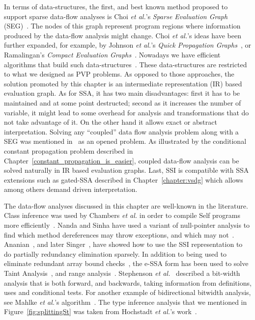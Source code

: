 In terms of data-structures, the first, and best known method proposed to support sparse data-flow analyses is Choi {\em et al.}'s {\em Sparse Evaluation Graph} (SEG)~\cite{Choi91}.
The nodes of this graph represent program regions where information produced by the data-flow analysis might change.
Choi {\em et al.}'s ideas have been further expanded, for example, by Johnson {\em et al.}'s {\em Quick Propagation Graphs}~\cite{Johnson93}, or Ramalingan's {\em Compact Evaluation Graphs}~\cite{Ramalingan02}.
Nowadays we have efficient algorithms that build such data-structures~\cite{Pingali95,Pingali97,Johnson94}.
These data-structures are restricted to what we designed as PVP problems.
As opposed to those approaches, the solution promoted by this chapter is an intermediate representation (IR) based evaluation graph. As for SSA, it has two main disadvantages: first it has to be maintained and at some point destructed; second as it increases the number of variable, it might lead to some overhead for analysis and transformations that do not take advantage of it. On the other hand it allows exact or abstract interpretation. Solving any ``coupled'' data flow analysis problem along with a SEG was mentioned in~\cite{Choi91} as an opened problem. As illustrated by the conditional constant propagation problem described in Chapter~\ref{constant_propagation_is_easier}, coupled data-flow analysis can be solved naturally in IR based evaluation graphs. Last, SSI is compatible with SSA extensions such as gated-SSA described in Chapter~\ref{chapter:vsdg} which allows among others demand driven interpretation.

The data-flow analyses discussed in this chapter are well-known in the literature.
Class inference was used by Chambers {\em et al.} in order to compile Self programs more efficiently~\cite{Chambers89}.
Nanda and Sinha have used a variant of null-pointer analysis to find which method dereferences may throw exceptions, and which may not~\cite{Nanda09}.
Ananian~\cite{Ananian99}, and later Singer~\cite{Singer06}, have showed how to use the SSI representation to do partially redundancy elimination sparsely.
In addition to being used to eliminate redundant array bound checks~\cite{Bodik00}, the e-SSA form has been used to solve Taint Analysis~\cite{Rimsa11}, and range analysis~\cite{Su05,Gawlitza09}.
Stephenson {\em et al.}~\cite{Stephenson00} described a bit-width analysis that is both forward, and backwards, taking information from definitions, uses and conditional tests.
For another example of bidirectional bitwidth analysis, see Mahlke {\em et al.}'s algorithm~\cite{Mahlke01}.
The type inference analysis that we mentioned in Figure~\ref{fig:splittingSt} was taken from Hochstadt {\em et al.}'s work~\cite{Hochstadt08}.

